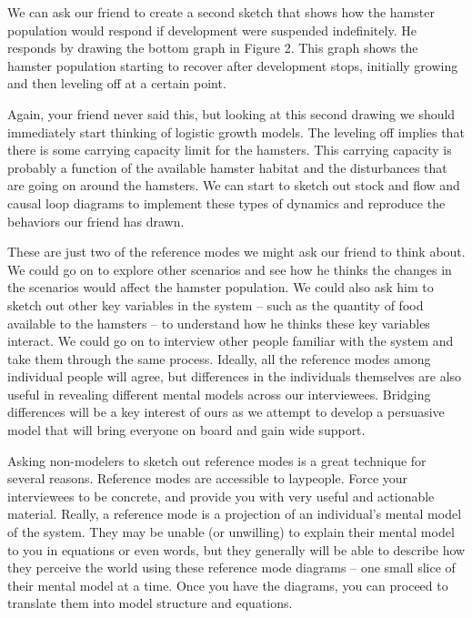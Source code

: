 \documentclass[]{memoir}
\begin{document}
We can ask our friend to create a second sketch that shows how the
hamster population would respond if development were suspended
indefinitely. He responds by drawing the bottom graph in Figure 2. This
graph shows the hamster population starting to recover after development
stops, initially growing and then leveling off at a certain point.

Again, your friend never said this, but looking at this second drawing
we should immediately start thinking of logistic growth models. The
leveling off implies that there is some carrying capacity limit for the
hamsters. This carrying capacity is probably a function of the available
hamster habitat and the disturbances that are going on around the
hamsters. We can start to sketch out stock and flow and causal loop
diagrams to implement these types of dynamics and reproduce the
behaviors our friend has drawn.

These are just two of the reference modes we might ask our friend to
think about. We could go on to explore other scenarios and see how he
thinks the changes in the scenarios would affect the hamster population.
We could also ask him to sketch out other key variables in the system --
such as the quantity of food available to the hamsters -- to understand
how he thinks these key variables interact. We could go on to interview
other people familiar with the system and take them through the same
process. Ideally, all the reference modes among individual people will
agree, but differences in the individuals themselves are also useful in
revealing different mental models across our interviewees. Bridging
differences will be a key interest of ours as we attempt to develop a
persuasive model that will bring everyone on board and gain wide
support.

Asking non-modelers to sketch out reference modes is a great technique
for several reasons. Reference modes are accessible to laypeople. Force
your interviewees to be concrete, and provide you with very useful and
actionable material. Really, a reference mode is a projection of an
individual's mental model of the system. They may be unable (or
unwilling) to explain their mental model to you in equations or even
words, but they generally will be able to describe how they perceive the
world using these reference mode diagrams -- one small slice of their
mental model at a time. Once you have the diagrams, you can proceed to
translate them into model structure and equations.

\paragraph{}
\end{document}
